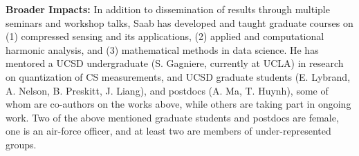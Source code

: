  {\bf Broader Impacts: }  In addition to dissemination of results through multiple seminars and workshop talks, Saab has developed and taught graduate courses on (1) compressed sensing and its applications, (2) applied and computational harmonic analysis, and (3) mathematical methods in data science. He has  mentored a UCSD undergraduate (S. Gagniere, currently at UCLA) in research on quantization of CS measurements, and UCSD graduate students (E. Lybrand, A. Nelson, B. Preskitt, J. Liang), and postdocs (A. Ma, T. Huynh),  some of whom are co-authors on the works above, while others are taking part in ongoing work. Two of the above mentioned graduate students and postdocs are female, one is an air-force officer, and at least two are members of under-represented groups.%

